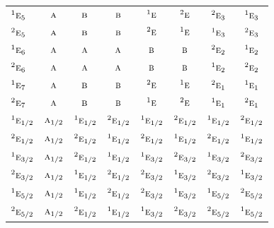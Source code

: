 \documentclass[10pt,a4paper]{article}
\numberwithin{equation}{section}
\newcommand{\irr}[1]{\text{\normalfont\scshape #1}}
\newcommand{\conjpair}[1]{{}^{#1}}
\begin{document}
{\begin{longtable}{@{}lccccccc@{}}
$\conjpair{1}\irr{e}_{5}$ & $\irr{a}$ & $\irr{b}$ & $\irr{b}$ & $\conjpair{1}\irr{e}$ & $\conjpair{2}\irr{e}$ & $\conjpair{2}\irr{e}_{3}$ & $\conjpair{1}\irr{e}_{3}$\\
$\conjpair{2}\irr{e}_{5}$ & $\irr{a}$ & $\irr{b}$ & $\irr{b}$ & $\conjpair{2}\irr{e}$ & $\conjpair{1}\irr{e}$ & $\conjpair{1}\irr{e}_{3}$ & $\conjpair{2}\irr{e}_{3}$\\
$\conjpair{1}\irr{e}_{6}$ & $\irr{a}$ & $\irr{a}$ & $\irr{a}$ & $\irr{b}$ & $\irr{b}$ & $\conjpair{2}\irr{e}_{2}$ & $\conjpair{1}\irr{e}_{2}$\\
$\conjpair{2}\irr{e}_{6}$ & $\irr{a}$ & $\irr{a}$ & $\irr{a}$ & $\irr{b}$ & $\irr{b}$ & $\conjpair{1}\irr{e}_{2}$ & $\conjpair{2}\irr{e}_{2}$\\
$\conjpair{1}\irr{e}_{7}$ & $\irr{a}$ & $\irr{b}$ & $\irr{b}$ & $\conjpair{2}\irr{e}$ & $\conjpair{1}\irr{e}$ & $\conjpair{2}\irr{e}_{1}$ & $\conjpair{1}\irr{e}_{1}$\\
$\conjpair{2}\irr{e}_{7}$ & $\irr{a}$ & $\irr{b}$ & $\irr{b}$ & $\conjpair{1}\irr{e}$ & $\conjpair{2}\irr{e}$ & $\conjpair{1}\irr{e}_{1}$ & $\conjpair{2}\irr{e}_{1}$\\
$\conjpair{1}\irr{e}_{1/2}$ & $\irr{a}_{1/2}$ & $\conjpair{1}\irr{e}_{1/2}$ & $\conjpair{2}\irr{e}_{1/2}$ & $\conjpair{1}\irr{e}_{1/2}$ & $\conjpair{2}\irr{e}_{1/2}$ & $\conjpair{1}\irr{e}_{1/2}$ & $\conjpair{2}\irr{e}_{1/2}$\\
$\conjpair{2}\irr{e}_{1/2}$ & $\irr{a}_{1/2}$ & $\conjpair{2}\irr{e}_{1/2}$ & $\conjpair{1}\irr{e}_{1/2}$ & $\conjpair{2}\irr{e}_{1/2}$ & $\conjpair{1}\irr{e}_{1/2}$ & $\conjpair{2}\irr{e}_{1/2}$ & $\conjpair{1}\irr{e}_{1/2}$\\
$\conjpair{1}\irr{e}_{3/2}$ & $\irr{a}_{1/2}$ & $\conjpair{2}\irr{e}_{1/2}$ & $\conjpair{1}\irr{e}_{1/2}$ & $\conjpair{1}\irr{e}_{3/2}$ & $\conjpair{2}\irr{e}_{3/2}$ & $\conjpair{1}\irr{e}_{3/2}$ & $\conjpair{2}\irr{e}_{3/2}$\\
$\conjpair{2}\irr{e}_{3/2}$ & $\irr{a}_{1/2}$ & $\conjpair{1}\irr{e}_{1/2}$ & $\conjpair{2}\irr{e}_{1/2}$ & $\conjpair{2}\irr{e}_{3/2}$ & $\conjpair{1}\irr{e}_{3/2}$ & $\conjpair{2}\irr{e}_{3/2}$ & $\conjpair{1}\irr{e}_{3/2}$\\
$\conjpair{1}\irr{e}_{5/2}$ & $\irr{a}_{1/2}$ & $\conjpair{1}\irr{e}_{1/2}$ & $\conjpair{2}\irr{e}_{1/2}$ & $\conjpair{2}\irr{e}_{3/2}$ & $\conjpair{1}\irr{e}_{3/2}$ & $\conjpair{1}\irr{e}_{5/2}$ & $\conjpair{2}\irr{e}_{5/2}$\\
$\conjpair{2}\irr{e}_{5/2}$ & $\irr{a}_{1/2}$ & $\conjpair{2}\irr{e}_{1/2}$ & $\conjpair{1}\irr{e}_{1/2}$ & $\conjpair{1}\irr{e}_{3/2}$ & $\conjpair{2}\irr{e}_{3/2}$ & $\conjpair{2}\irr{e}_{5/2}$ & $\conjpair{1}\irr{e}_{5/2}$\\

\end{longtable}}
\end{document}
